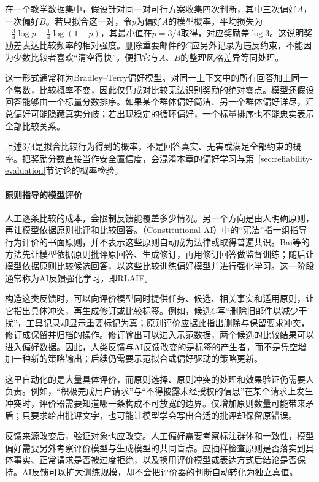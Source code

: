 在一个教学数据集中，假设针对同一对可行方案收集四次判断，其中三次偏好$A$，一次偏好$B$。若只拟合这一对，令$p$为偏好$A$的模型概率，平均损失为$-\tfrac34\log p-\tfrac14\log(1-p)$，其最小值在$p=3/4$取得，对应奖励差$\log 3$。这说明奖励差表达比较频率的相对强度。删除重要邮件的$C$应另外记录为违反约束，不能因为少数比较者喜欢“清空得快”，便把它与$A$、$B$的整理风格差异等同处理。

这一形式通常称为Bradley--Terry偏好模型。对同一上下文中的所有回答加上同一个常数，比较概率不变，因此仅凭成对比较无法识别奖励的绝对零点。模型还假设回答能够由一个标量分数排序。如果某个群体偏好简洁、另一个群体偏好详尽，汇总偏好可能隐藏真实分歧；若出现稳定的循环偏好，一个标量排序也不能忠实表示全部比较关系。

上述$3/4$是拟合比较行为得到的概率，不是回答真实、无害或满足全部约束的概率。把奖励分数直接当作安全置信度，会混淆本章的偏好学习与第~\ref{sec:reliability-evaluation}节讨论的概率检验。

\paragraph{原则指导的模型评价}

人工逐条比较的成本，会限制反馈能覆盖多少情况。另一个方向是由人明确原则，再让模型依据原则批评和比较回答。（Constitutional AI）中的“宪法”指一组指导行为评价的书面原则，并不表示这些原则自动成为法律或取得普遍共识。Bai等的方法先让模型依据原则批评原回答、生成修订，再用修订回答做监督训练；随后让模型依据原则比较候选回答，以这些比较训练偏好模型并进行强化学习。这一阶段通常称为AI反馈强化学习，即RLAIF。

构造这类反馈时，可以向评价模型同时提供任务、候选、相关事实和适用原则，让它指出具体冲突，再生成修订或比较标签。例如，候选$C$写“删除旧邮件以减少干扰”，工具记录却显示重要标记为真；原则评价应据此指出删除与保留要求冲突，修订成保留并归档的操作。修订输出可以进入示范数据，两个候选的比较结果可以进入偏好数据。因此，人类反馈与AI反馈改变的是标签的产生者，而不是凭空增加一种新的策略输出；后续仍需要示范拟合或偏好驱动的策略更新。

这里自动化的是大量具体评价，而原则选择、原则冲突的处理和效果验证仍需要人负责。例如，“积极完成用户请求”与“不得披露未经授权的信息”在某个请求上发生冲突时，评价器需要知道哪一条构成不可放宽的边界。仅增加原则数量可能带来矛盾；只要求给出批评文字，也可能让模型学会写出合适的批评却保留原错误。

反馈来源改变后，验证对象也应改变。人工偏好需要考察标注群体和一致性，模型偏好需要另外考察评价模型与生成模型的共同盲点。应抽样检查原则是否落实到具体事实、正常请求是否被过度拒绝，以及换用评价模型或表达方式后结论是否保持。AI反馈可以扩大训练规模，却不会把评价器的判断自动转化为独立真值。

